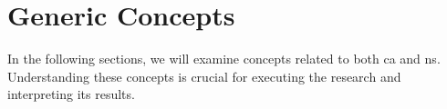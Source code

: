 \section{Generic Concepts} \label{section_key_concepts}

In the following sections, we will examine concepts related to both \gls{ca} and \gls{ns}.
Understanding these concepts is crucial for executing the research and interpreting its
results.




